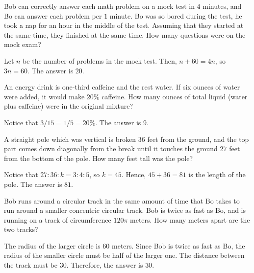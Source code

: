 \begin{problem}
Bob can correctly answer each math problem on a mock test in $4$ minutes, and Bo can answer each problem per $1$ minute. Bo was so bored during the test, he took a nap for an hour in the middle of the test. Assuming that they started at the same time, they finished at the same time. How many questions were on the mock exam?
\end{problem}

\begin{solution}
Let $n$ be the number of problems in the mock test. Then, $n+60=4n$, so $3n=60$. The answer is $20$. 
\end{solution}

\begin{problem}
An energy drink is one-third caffeine and the rest water. If six ounces of water were added, it would make $20\%$ caffeine. How many ounces of total liquid (water plus caffeine) were in the original mixture?
\end{problem}

\begin{solution}
Notice that $3/15=1/5=20\%$. The answer is $9$. 
\end{solution}

\begin{problem}
A straight pole which was vertical is broken $36$ feet from the ground, and the top part comes down diagonally from the break until it touches the ground $27$ feet from the bottom of the pole. How many feet tall was the pole?
\end{problem}

\begin{solution}
Notice that $27:36:k=3:4:5$, so $k=45$. Hence, $45+36=81$ is the length of the pole. The answer is $81$.
\end{solution}

\begin{problem}
Bob runs around a circular track in the same amount of
time that Bo takes to run around a smaller concentric circular track. Bob is twice as fast as Bo, and is running on a track of circumference $120\pi$ meters. How many meters apart are the two tracks?
\end{problem}

\begin{solution}
The radius of the larger circle is $60$ meters. Since Bob is twice as fast as Bo, the radius of the smaller circle must be half of the larger one. The distance between the track must be $30$. Therefore, the answer is $30$. 
\end{solution}

